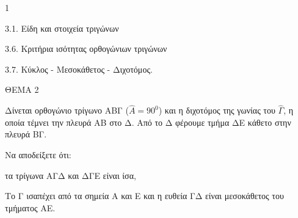 \begin{ylh}{1}
    \item 3.1. Είδη και στοιχεία τριγώνων
    \item 3.6. Κριτήρια ισότητας ορθογώνιων τριγώνων
    \item 3.7. Κύκλος - Μεσοκάθετος - Διχοτόμος.
\end{ylh}

ΘΕΜΑ 2

Δίνεται ορθογώνιο τρίγωνο ΑΒΓ ($\widehat{Α} = 90^{0}$) και η διχοτόμος της γωνίας του $\widehat{\Gamma}$, η οποία τέμνει την πλευρά ΑΒ στο Δ. Από το Δ φέρουμε τμήμα ΔΕ κάθετο στην πλευρά ΒΓ.

Να αποδείξετε ότι:

\begin{alist}
\item τα τρίγωνα ΑΓΔ και ΔΓΕ είναι ίσα, 

\item Το Γ ισαπέχει από τα σημεία Α και Ε και η ευθεία ΓΔ είναι μεσοκάθετος του τμήματος ΑΕ. 
\end{alist}
